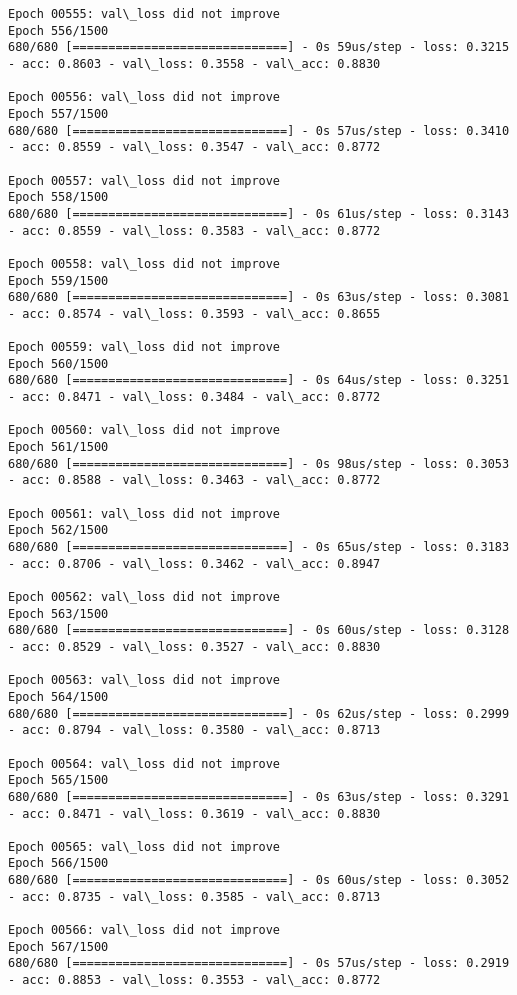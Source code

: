 \documentclass[11pt]{article}
\begin{document}
\begin{Verbatim}[commandchars=\\\{\}]
Epoch 00555: val\_loss did not improve
Epoch 556/1500
680/680 [==============================] - 0s 59us/step - loss: 0.3215 - acc: 0.8603 - val\_loss: 0.3558 - val\_acc: 0.8830

Epoch 00556: val\_loss did not improve
Epoch 557/1500
680/680 [==============================] - 0s 57us/step - loss: 0.3410 - acc: 0.8559 - val\_loss: 0.3547 - val\_acc: 0.8772

Epoch 00557: val\_loss did not improve
Epoch 558/1500
680/680 [==============================] - 0s 61us/step - loss: 0.3143 - acc: 0.8559 - val\_loss: 0.3583 - val\_acc: 0.8772

Epoch 00558: val\_loss did not improve
Epoch 559/1500
680/680 [==============================] - 0s 63us/step - loss: 0.3081 - acc: 0.8574 - val\_loss: 0.3593 - val\_acc: 0.8655

Epoch 00559: val\_loss did not improve
Epoch 560/1500
680/680 [==============================] - 0s 64us/step - loss: 0.3251 - acc: 0.8471 - val\_loss: 0.3484 - val\_acc: 0.8772

Epoch 00560: val\_loss did not improve
Epoch 561/1500
680/680 [==============================] - 0s 98us/step - loss: 0.3053 - acc: 0.8588 - val\_loss: 0.3463 - val\_acc: 0.8772

Epoch 00561: val\_loss did not improve
Epoch 562/1500
680/680 [==============================] - 0s 65us/step - loss: 0.3183 - acc: 0.8706 - val\_loss: 0.3462 - val\_acc: 0.8947

Epoch 00562: val\_loss did not improve
Epoch 563/1500
680/680 [==============================] - 0s 60us/step - loss: 0.3128 - acc: 0.8529 - val\_loss: 0.3527 - val\_acc: 0.8830

Epoch 00563: val\_loss did not improve
Epoch 564/1500
680/680 [==============================] - 0s 62us/step - loss: 0.2999 - acc: 0.8794 - val\_loss: 0.3580 - val\_acc: 0.8713

Epoch 00564: val\_loss did not improve
Epoch 565/1500
680/680 [==============================] - 0s 63us/step - loss: 0.3291 - acc: 0.8471 - val\_loss: 0.3619 - val\_acc: 0.8830

Epoch 00565: val\_loss did not improve
Epoch 566/1500
680/680 [==============================] - 0s 60us/step - loss: 0.3052 - acc: 0.8735 - val\_loss: 0.3585 - val\_acc: 0.8713

Epoch 00566: val\_loss did not improve
Epoch 567/1500
680/680 [==============================] - 0s 57us/step - loss: 0.2919 - acc: 0.8853 - val\_loss: 0.3553 - val\_acc: 0.8772


\end{Verbatim}
\end{document}
